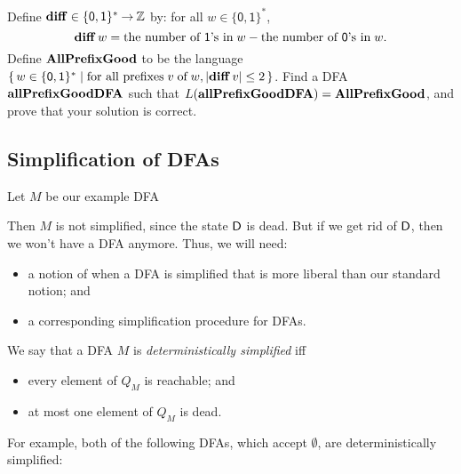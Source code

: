 \begin{exercise}
\label{AllGoodDFACorrLem}
Define $\mathbf{diff}\in\{\mathsf{0,1}\}^*\mathbin{\to}\mathbb{Z}$ by:
%
%
%
%
for all $w\in\{\mathsf{0,1}\}^*$,
\begin{displaymath}
\mathbf{diff}\,w =
\allowbreak\mbox{the number of $\mathsf{1}$'s in}\allowbreak\;w -
\allowbreak\mbox{the number of $\mathsf{0}$'s in}\allowbreak\;w .
\end{displaymath}
Define $\mathbf{AllPrefixGood}$ to be the language
$\{ \, w\in\{\mathsf{0,1}\}^* \mid \allowbreak\mbox{for all prefixes}\allowbreak\; v\;\allowbreak\mbox{of}\allowbreak\;
  w, |\mathbf{diff}\,v|\leq 2 \, \}$.  Find a DFA $\mathbf{allPrefixGoodDFA}$ such that
$L(\mathbf{allPrefixGoodDFA}) = \mathbf{AllPrefixGood}$, and prove that your solution
is correct.
\end{exercise}

\subsection{Simplification of DFAs}

Let $M$ be our example DFA
\begin{center}

\end{center}
Then $M$ is not simplified, since the state $\mathsf{D}$ is dead.  But if we
get rid of $\mathsf{D}$, then we won't have a DFA anymore.  Thus, we will
need:
\begin{itemize}
\item a notion of when a DFA is simplified that is more liberal than
  our standard notion; and

\item a corresponding simplification procedure for DFAs.
\end{itemize}
We say that a DFA $M$ is \emph{deterministically simplified} iff
\begin{itemize}
\item every element of $Q_M$ is reachable; and

\item at most one element of $Q_M$ is dead.
\end{itemize}
For example, both of the following DFAs, which accept $\emptyset$,
are deterministically simplified:
\begin{center}

\end{center}

